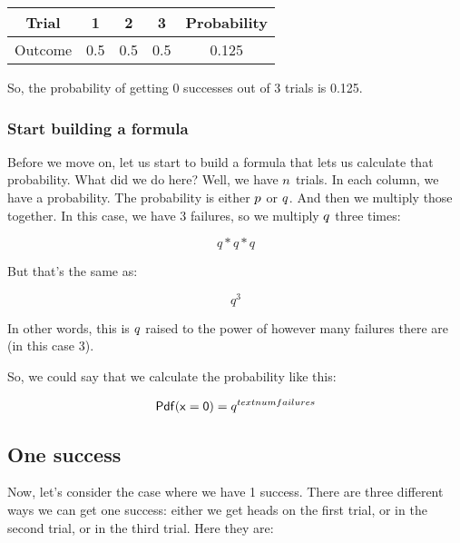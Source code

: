\documentclass[../../../main.tex]{subfiles}
\begin{document}
\begin{center}
  \begin{tabular}{| c | c | c | c | c |}
    \hline
    \textbf{Trial} & \textbf{1} & \textbf{2} & \textbf{3} & \textbf{Probability} \\ \hline
    Outcome & 0.5 & 0.5 & 0.5 & 0.125 \\ \hline
  \end{tabular}
\end{center}

\noindent
So, the probability of getting 0 successes out of 3 trials is 0.125.


\subsubsection{Start building a formula}

Before we move on, let us start to build a formula that lets us calculate that probability. What did we do here? Well, we have $\numTrials/$ trials. In each column, we have a probability. The probability is either $\success/$ or $\failure/$. And then we multiply those together. In this case, we have 3 failures, so we multiply $\failure/$ three times:

\begin{equation*}
  q * q * q
\end{equation*}

But that's the same as:

\begin{equation*}
  q^{3}
\end{equation*}

In other words, this is $\failure/$ raised to the power of however many failures there are (in this case 3).

So, we could say that we calculate the probability like this:

\begin{equation*}
  \mathsf{Pdf(x = 0)} = q^{text{num failures}}
\end{equation*}


\subsection{One success}

Now, let's consider the case where we have 1 success. There are three different ways we can get one success: either we get heads on the first trial, or in the second trial, or in the third trial. Here they are:
\end{document}
